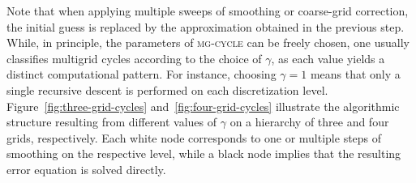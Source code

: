 Note that when applying multiple sweeps of smoothing or coarse-grid correction, the initial guess is replaced by the approximation obtained in the previous step.
While, in principle, the parameters of \textsc{mg-cycle} can be freely chosen, one usually classifies multigrid cycles according to the choice of $\gamma$, as each value yields a distinct computational pattern.
For instance, choosing $\gamma = 1$ means that only a single recursive descent is performed on each discretization level.
Figure~\ref{fig:three-grid-cycles} and~\ref{fig:four-grid-cycles} illustrate the algorithmic structure resulting from different values of $\gamma$ on a hierarchy of three and four grids, respectively.
Each white node corresponds to one or multiple steps of smoothing on the respective level, while a black node implies that the resulting error equation is solved directly.

